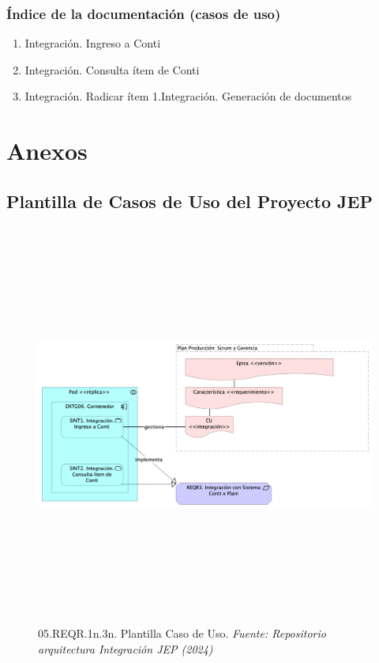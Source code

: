 \documentclass[
  paper=a4,
  ,captions=tableheading
]{scrartcl}
\providecommand{\tightlist}{%
  \setlength{\itemsep}{0pt}\setlength{\parskip}{0pt}}
\begin{document}
\subsubsection{Índice de la documentación (casos de
uso)}\label{sec:uxedndice-de-la-documentaciuxf3n-casos-de-uso}

\begin{enumerate}
\def\labelenumi{\arabic{enumi}.}
\tightlist
\item
  Integración. Ingreso a Conti
\item
  Integración. Consulta ítem de Conti
\item
  Integración. Radicar ítem 1.Integración. Generación de documentos
\end{enumerate}

\newpage

\section{Anexos}\label{sec:anexos}

\subsection{Plantilla de Casos de Uso del Proyecto
JEP}\label{sec:plantilla-de-casos-de-uso-del-proyecto-jep}

\begin{figure}
\centering
\includegraphics[width=\textwidth,height=5.20833in]{images/05.REQR.1n.3n.PlantillaCasodeUso.png}
\caption{05.REQR.1n.3n. Plantilla Caso de Uso. \emph{Fuente: Repositorio
arquitectura Integración JEP
(2024)}}\label{fig:id-8115cb4314954a7cb873b534038c22aa}
\end{figure}
\end{document}
